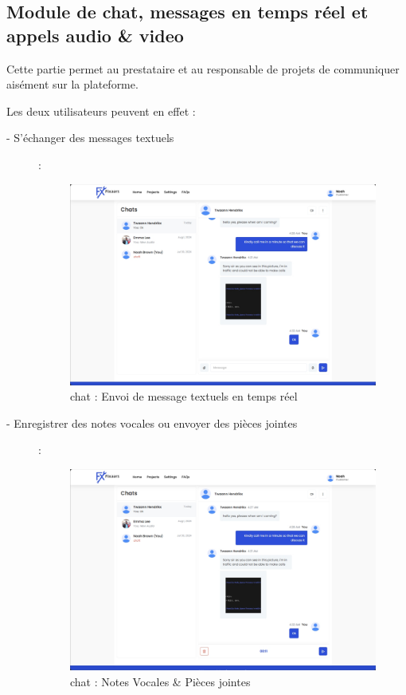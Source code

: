\subsection{Module de chat, messages en temps réel et appels audio \& video}

Cette partie permet au prestataire et au responsable de projets de communiquer aisément sur la plateforme.

Les deux utilisateurs peuvent en effet : 

\begin{description}
    \item[- S'échanger des messages textuels] :

\vspace{0.35cm}
\begin{figure}[H]
\begin{center}
\includegraphics[width=12cm]{assets/demo/chat-1.png}
\end{center}
\caption{chat : Envoi de message textuels en temps réel}
\end{figure}

    \item [- Enregistrer des notes vocales ou envoyer des pièces jointes] : 

\vspace{0.35cm}
\begin{figure}[H]
\begin{center}
\includegraphics[width=12cm]{assets/demo/chat-2.png}
\end{center}
\caption{chat : Notes Vocales \& Pièces jointes}
\end{figure}


\end{description}
